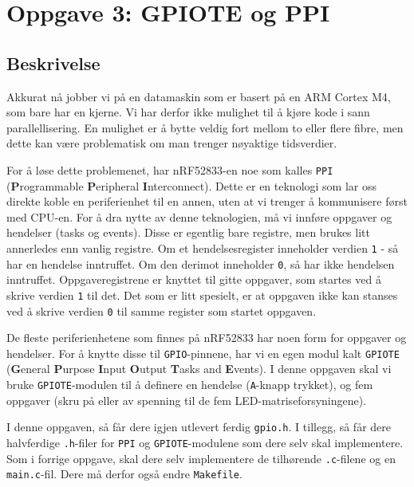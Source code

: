 \section{Oppgave 3: GPIOTE og PPI}
\subsection{Beskrivelse}


Akkurat nå jobber vi på en datamaskin som er basert på en ARM Cortex M4, som bare har en kjerne. Vi har derfor ikke mulighet til å kjøre kode i sann parallellisering. En mulighet er å bytte veldig fort mellom to eller flere fibre, men dette kan være problematisk om man trenger nøyaktige tidsverdier. 

For å løse dette problemenet, har nRF52833-en noe som kalles \verb|PPI| (\textbf{P}rogrammable \textbf{P}eripheral \textbf{I}nterconnect). Dette er en teknologi som lar oss direkte koble en periferienhet til en annen, uten at vi trenger å kommunisere først med CPU-en. For å dra nytte av denne teknologien, må vi innføre oppgaver og hendelser (tasks og events). Disse er egentlig bare registre, men brukes litt annerledes enn vanlig registre. Om et hendelsesregister inneholder verdien \verb|1| - så har en hendelse inntruffet. Om den derimot inneholder \verb|0|, så har ikke hendelsen inntruffet. Oppgaveregistrene er knyttet til gitte oppgaver, som startes ved å skrive verdien \verb|1| til det. Det som er litt spesielt, er at oppgaven ikke kan stanses ved å skrive verdien \verb|0| til samme register som startet oppgaven.

De fleste periferienhetene som finnes på nRF52833 har noen form for oppgaver og hendelser. For å knytte disse til \verb|GPIO|-pinnene, har vi en egen modul kalt \verb|GPIOTE| (\textbf{G}eneral \textbf{P}urpose \textbf{I}nput \textbf{O}utput \textbf{T}asks and \textbf{E}vents). I denne oppgaven skal vi bruke \verb|GPIOTE|-modulen til å definere en hendelse (\verb|A|-knapp trykket), og fem oppgaver (skru på eller av spenning til de fem LED-matriseforsyningene).


I denne oppgaven, så får dere igjen utlevert ferdig \verb|gpio.h|. I tillegg, så får dere halvferdige \verb|.h|-filer for \verb|PPI| og \verb|GPIOTE|-modulene som dere selv skal implementere. Som i forrige oppgave, skal dere selv implementere de tilhørende \verb|.c|-filene og en \verb|main.c|-fil. Dere må derfor også endre \verb|Makefile|.

